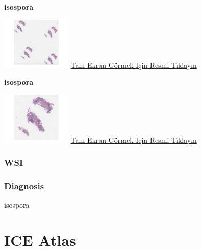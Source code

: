 \documentclass[
  letterpaper,
  DIV=11,
  numbers=noendperiod]{scrreprt}
\begin{document}
\textbf{isospora}

\href{https://images.patolojiatlasi.com/BS32/HE1.html}{\includegraphics[width=0.25\textwidth,height=\textheight]{./screenshots/BS32-HE1_screenshot.png}}
\href{https://images.patolojiatlasi.com/BS32/HE1.html}{Tam Ekran Görmek
İçin Resmi Tıklayın}

\textbf{isospora}

\href{https://images.patolojiatlasi.com/BS32/HE2.html}{\includegraphics[width=0.25\textwidth,height=\textheight]{./screenshots/BS32-HE2_screenshot.png}}
\href{https://images.patolojiatlasi.com/BS32/HE2.html}{Tam Ekran Görmek
İçin Resmi Tıklayın}

\subsection{WSI}

\subsection{Diagnosis}

\begin{tcolorbox}[enhanced jigsaw, left=2mm, toprule=.15mm, rightrule=.15mm, bottomrule=.15mm, leftrule=.75mm, colback=white, colframe=quarto-callout-tip-color-frame, toptitle=1mm, breakable, titlerule=0mm, colbacktitle=quarto-callout-tip-color!10!white, bottomtitle=1mm, title=\textcolor{quarto-callout-tip-color}{\faLightbulb}\hspace{0.5em}{Tanı için tıklayın}, arc=.35mm, opacitybacktitle=0.6, opacityback=0, coltitle=black]

isospora

\end{tcolorbox}

\hypertarget{ice-atlas}{%
\chapter{ICE Atlas}\label{ice-atlas}}
\end{document}
